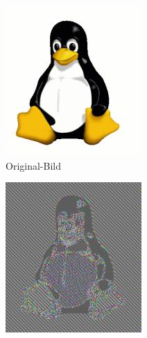 \begin{figure}[h]
  \centering
  \begin{subfigure}[b]{.3\textwidth}
    \centering
    \includegraphics[width=\textwidth]{images/Tux.jpg}
    \caption{Original-Bild}
  \end{subfigure}
  \hfill
  \begin{subfigure}[b]{.3\textwidth}
    \centering
    \includegraphics[width=\textwidth]{images/Tux_ecb.jpg}

\end{subfigure}
\end{figure}
